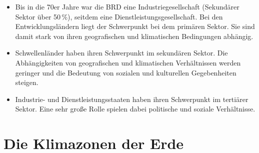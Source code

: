 \begin{itemize}
	\item Bis in die 70er Jahre war die BRD eine Industriegesellschaft (Sekundärer Sektor über 50\,\%),
	  seitdem eine Dienstleistungsgesellschaft.
	  Bei den Entwicklungsländern liegt der Schwerpunkt bei dem primären Sektor.
	  Sie sind damit stark von ihren geografischen und klimatischen Bedingungen abhängig.
	\item Schwellenländer haben ihren Schwerpunkt im sekundären Sektor.
	  Die Abhängigkeiten von geografischen und klimatischen Verhältnissen werden geringer und
	  die Bedeutung von sozialen und kulturellen Gegebenheiten steigen.
	\item Industrie- und Dienstleistungsstaaten haben ihren Schwerpunkt im tertiärer Sektor.
	  Eine sehr große Rolle spielen dabei politische und soziale Verhältnisse.
\end{itemize}

\section{Die Klimazonen der Erde}
\begin{figurewrapper}
\end{figurewrapper}

